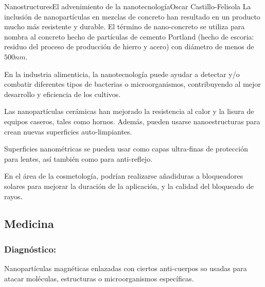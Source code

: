 \begin{article}{Nanostructures}{El advenimiento de la nanotecnolog\'ia}{Oscar Castillo-Felisola}
La inclusi\'on de nanopart\'iculas en mezclas de concreto han resultado en un producto mucho m\'as resistente y durable. El t\'ermino de nano-concreto se utiliza para nombra al concreto hecho de part\'iculas de cemento Portland (hecho de escoria: residuo del proceso de producci\'on de hierro y acero) con di\'ametro de menos de $500 n m$.


En la industria alimenticia, la nanotecnolog\'ia puede ayudar a detectar y/o combatir diferentes tipos de bacterias o microorganismos, contribuyendo al mejor desarrollo y eficiencia de los cultivos.

Las nanopart\'iculas cer\'amicas han mejorado la resistencia al calor y la lisura de equipos caseros, tales como hornos. Adem\'as, pueden usarse nanoestructuras para crean nuevas superficies auto-limpiantes.

Superficies nanom\'etricas se pueden usar como capas ultra-finas de protecci\'on para lentes, as\'i tambi\'en como para anti-reflejo.

En el \'area de la cosmetolog\'ia, podr\'ian realizarse a\~nadiduras a bloqueadores solares para mejorar la duraci\'on de la aplicaci\'on, y la calidad del bloqueado de rayos.





\subsection{Medicina}
\subsubsection*{Diagn\'ostico:}


Nanopart\'iculas magn\'eticas enlazadas con ciertos anti-cuerpos so usadas para atacar mol\'eculas, estructuras o microorganismos  espec\'ificas.


\end{article}
